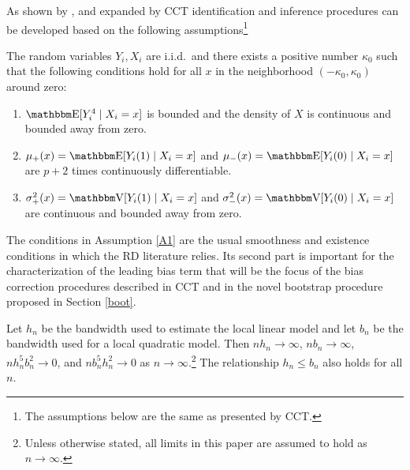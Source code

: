 \documentclass[12pt,fleqn]{article}
\begin{document}
As shown by \cite{HTV2001}, \cite{Porter03} and expanded by CCT identification and inference procedures can be developed based on the following assumptions\footnote{The assumptions below are the same as presented by CCT.}

\begin{assumption}\label{A1}
  The random variables $Y_i, X_i$ are i.i.d.\ and
  there exists a positive number $\kappa_0$ such that the following
  conditions hold for all $x$ in the neighborhood
  $(-\kappa_{0},\kappa_{0})$ around zero:
  \begin{enumerate}
  \item $\E[Y_{i}^{4} \mid X_{i}=x]$ is bounded and the density of $X$
    is continuous and bounded away from zero.
  \item $\mu_{+}(x) = \E[ Y_{i}(1) \mid X_{i}=x ]$ and
    $\mu_{-}(x) = \E[ Y_{i}(0) \mid X_{i}=x ]$ are $p+2$ times
    continuously differentiable.
  \item $\sigma^{2}_{+}(x)=\V[ Y_{i}(1) \mid X_{i}=x ]$ and
    $\sigma^{2}_{-}(x)=\V[ Y_{i}(0) \mid X_{i}=x ]$ are continuous and
    bounded away from zero.
 \end{enumerate}
\end{assumption}

The conditions in Assumption \ref{A1} are the usual smoothness and existence conditions in which the RD literature relies. Its second part is important for the characterization of the leading bias term that will be the focus of the bias correction procedures described in CCT and in the novel  bootstrap procedure proposed in Section \ref{boot}.

\begin{assumption}[Bandwidth]\label{A2}
  Let $h_n$ be the bandwidth used to estimate the local linear model and let
  $b_n$ be the bandwidth used for a local quadratic model. Then
  $n h_n \to \infty$, $n b_n \to \infty$, $n h_n^5 b_n^2 \to 0$, and
  $n b_n^5 h_n^2 \to 0$ as $n \to \infty$.\footnote{%
    Unless otherwise stated, all limits in this paper are assumed to hold as
    $n \to \infty$.} %
  The relationship $h_n \leq b_n$ also holds for all $n$.
\end{assumption}
\end{document}

